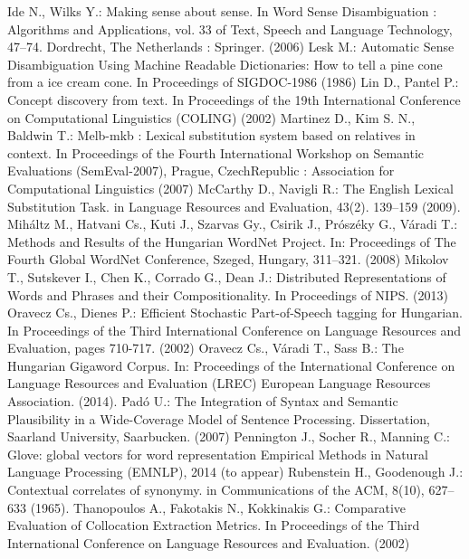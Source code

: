 \documentclass{llncs}
\begin{document}
\begin{thebibliography}{15}
%
Ide N., Wilks Y.:
Making sense about sense. 
In Word Sense Disambiguation : Algorithms and Applications, vol. 33 of Text, Speech and Language Technology, 47--74. Dordrecht, The Netherlands : Springer. (2006)
%
Lesk M.:
Automatic Sense Disambiguation Using Machine Readable Dictionaries: How to tell a pine cone from a ice cream cone.
In Proceedings of SIGDOC-1986 (1986)
%
Lin D., Pantel P.:
Concept discovery from text.
In Proceedings of the 19th International Conference on Computational Linguistics (COLING) (2002)
%
Martinez D., Kim S. N., Baldwin T.:
Melb-mkb : Lexical substitution system based on relatives in context. 
In Proceedings of the Fourth International Workshop on Semantic Evaluations (SemEval-2007), Prague, CzechRepublic : Association for Computational Linguistics (2007)
%
McCarthy D., Navigli R.:
The English Lexical Substitution Task.
in Language Resources and Evaluation, 43(2). 139--159 (2009).
%
Mih\'{a}ltz M., Hatvani Cs., Kuti J., Szarvas Gy., Csirik J., Pr\'{o}sz\'{e}ky G., V\'{a}radi T.:
Methods and Results of the Hungarian WordNet Project.
 In: Proceedings of The Fourth Global WordNet Conference, Szeged, Hungary, 311--321. (2008)
%
Mikolov T., Sutskever I., Chen K., Corrado G., Dean J.:
Distributed Representations of Words and Phrases and their Compositionality.
In Proceedings of NIPS. (2013) 
%
Oravecz Cs., Dienes P.:
Efficient Stochastic Part-of-Speech tagging for Hungarian.
In Proceedings of the Third International Conference on Language Resources and Evaluation, pages 710-717. (2002)
%
Oravecz Cs., V\'{a}radi T., Sass B.:
The Hungarian Gigaword Corpus.
In: Proceedings of the International Conference on Language Resources and Evaluation (LREC) European Language Resources Association. (2014).
%
Pad\'{o} U.:
The Integration of Syntax and Semantic Plausibility in a Wide-Coverage Model of Sentence Processing.
Dissertation, Saarland University, Saarbucken. (2007)
%
Pennington J., Socher R., Manning C.:
Glove: global vectors for word representation
Empirical Methods in Natural Language Processing (EMNLP), 2014 (to appear)
%
Rubenstein H., Goodenough J.:
Contextual correlates of synonymy.
in Communications of the ACM, 8(10), 627--633 (1965).
%
Thanopoulos A., Fakotakis N., Kokkinakis G.:
Comparative Evaluation of Collocation Extraction Metrics.
In Proceedings of the Third International Conference on Language Resources and Evaluation. (2002)

\end{thebibliography}
\end{document}

